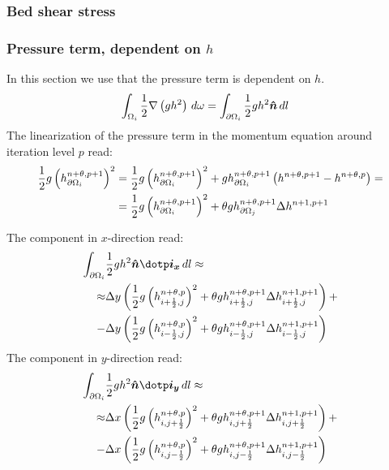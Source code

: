 \subsubsection{Bed shear stress}
\notyet

\subsubsection{Pressure term, dependent on $h$}
In this section we use that the pressure term is dependent on $h$.
\begin{align}
    \int_{\Omega_i} \frac{1}{2}  \nabla \left( g h^2\right) \, d\omega & =
    \int_{\partial\Omega_i} \frac{1}{2}  g h^2 \mbox{\boldmath $\hat n$}\, dl \label{eq:2d_press_term}
\end{align}
The linearization of the pressure term in the momentum equation around iteration level $p$ read:
\begin{align}
    \frac{1}{2} g \left(h^{n+\theta,p+1}_{\partial\Omega_i}\right)^2  & =
    \frac{1}{2} g \left(h^{n+\theta,p+1}_{\partial\Omega_i}\right)^2
    + g h^{n+\theta,p+1}_{\partial\Omega_i} \left({h}^{n+\theta,p+1} - {h}^{n+\theta,p}\right) =
    \\
    & = \frac{1}{2} g \left(h^{n+\theta,p+1}_{\partial\Omega_i}\right)^2 + \theta  g h^{n+\theta,p+1}_{\partial\Omega_j} \Delta {h}^{n+1,p+1}
\end{align}

The component in $x$-direction read:
\begin{align}
    \int_{\partial\Omega_i} & \half  g h^2 \vec{\hat n} \dotp \vec{i_x}\, dl \approx
    \nonumber \\
    \approx  & \Dy \left( \half g \left(h^{n+\theta,p}_{i+\half,j}\right)^2 + \theta  g h^{n+\theta,p+1}_{i+\half,j} \Delta {h}^{n+1,p+1}_{i+\half,j}  \right) +
    \nonumber \\
    - & \Dy \left( \half g \left(h^{n+\theta,p}_{i-\half,j}\right)^2 + \theta  g h^{n+\theta,p+1}_{i-\half,j} \Delta {h}^{n+1,p+1}_{i-\half,j}  \right)
\end{align}
The component in $y$-direction read:
\begin{align}
    \int_{\partial\Omega_i} & \half  g h^2 \vec{\hat n} \dotp \vec{i_y}\, dl \approx
    \nonumber \\
    \approx  & \Dx \left( \half g \left(h^{n+\theta,p}_{i,j+\half}\right)^2 + \theta  g h^{n+\theta,p+1}_{i,j+\half} \Delta {h}^{n+1,p+1}_{i,j+\half}  \right) +
    \nonumber \\
    - & \Dx \left( \half g \left(h^{n+\theta,p}_{i,j-\half}\right)^2 + \theta  g h^{n+\theta,p+1}_{i,j-\half} \Delta {h}^{n+1,p+1}_{i,j-\half}  \right)
\end{align}

